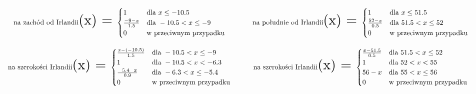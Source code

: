 \documentclass{article}
\begin{document}
\begin{equation*}
\begin{minipage}{0.5\textwidth}
\centering
\text{\scalebox{0.5}{na zachód od Irlandii}}(x) = \scalebox{0.5}{$
\begin{cases} 
1 & \text{dla } x \leq -10.5 \\
\frac{-9 - x}{1.5} & \text{dla } -10.5 < x \leq -9 \\
0 & \text{w przeciwnym przypadku}
\end{cases}
$}
\end{minipage}%
\begin{minipage}{0.5\textwidth}
\centering
\text{\scalebox{0.5}{na południe od Irlandii}}(x) = \scalebox{0.5}{$
\begin{cases} 
1 & \text{dla } x \leq 51.5 \\
\frac{52 - x}{0.5} & \text{dla } 51.5 < x \leq 52 \\
0 & \text{w przeciwnym przypadku}
\end{cases}
$}
\end{minipage}
\end{equation*}
\begin{equation*}
\begin{minipage}{0.5\textwidth}
\centering
\text{\scalebox{0.5}{na szerokości Irlandii}}(x) = \scalebox{0.5}{$
\begin{cases} 
\frac{x - (-10.5)}{1.5} & \text{dla } -10.5 < x \leq -9 \\
1 & \text{dla } -10.5 < x < -6.3 \\
\frac{-5.4 - x}{0.9} & \text{dla } -6.3 < x \leq -5.4 \\
0 & \text{w przeciwnym przypadku}
\end{cases}
$}
\end{minipage}%
\begin{minipage}{0.5\textwidth}
\centering
\text{\scalebox{0.5}{na szerokości Irlandii}}(x) = \scalebox{0.5}{$
\begin{cases} 
\frac{x - 51.5}{0.5} & \text{dla } 51.5 < x \leq 52 \\
1 & \text{dla } 52 < x < 55 \\
56 - x & \text{dla } 55 < x \leq 56 \\
0 & \text{w przeciwnym przypadku}
\end{cases}
$}
\end{minipage}
\end{equation*}
\end{document}
